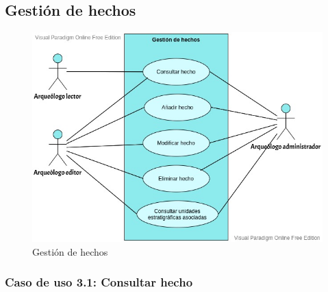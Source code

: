 \subsection{Gestión de hechos}
    \begin{figure}[H]
        \centering
        \includegraphics[scale=0.50]{imagenes/diagramas CU/fact-UC.jpeg}
        \caption{Gestión de hechos}
        \label{fig:fact-management}
    \end{figure}

\subsubsection{Caso de uso 3.1: Consultar hecho}

